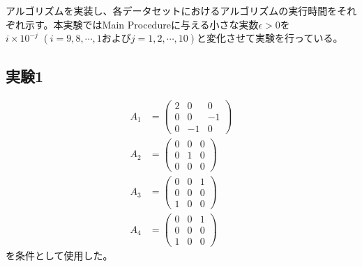 アルゴリズムを実装し、各データセットにおけるアルゴリズムの実行時間をそれぞれ示す。本実験ではMain Procedureに与える小さな実数$\epsilon > 0$を$i \times 10^{-j} \,\, (i = 9, 8, \cdots, 1\text{および}j = 1, 2, \cdots, 10)$と変化させて実験を行っている。

\subsection{実験1}
\begin{align*}
  A_1 & = \left(
            \begin{array}{ccc}
              2 &  0 &  0 \\
              0 &  0 & -1 \\
              0 & -1 &  0
            \end{array}
          \right) \\
  A_2 & = \left(
            \begin{array}{ccc}
              0 & 0 & 0 \\
              0 & 1 & 0 \\
              0 & 0 & 0
            \end{array}
          \right) \\
  A_3 & = \left(
            \begin{array}{ccc}
              0 & 0 & 1 \\
              0 & 0 & 0 \\
              1 & 0 & 0
            \end{array}
          \right) \\
  A_4 & = \left(
            \begin{array}{ccc}
              0 & 0 & 1 \\
              0 & 0 & 0 \\
              1 & 0 & 0
            \end{array}
          \right)
\end{align*}
を条件として使用した。

